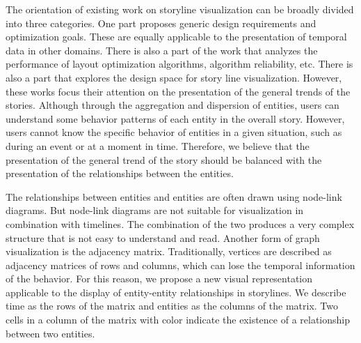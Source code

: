 The orientation of existing work on storyline visualization can be broadly divided into three categories. One part proposes generic design requirements and optimization goals. These are equally applicable to the presentation of temporal data in other domains. There is also a part of the work that analyzes the performance of layout optimization algorithms, algorithm reliability, etc. There is also a part that explores the design space for story line visualization. However, these works focus their attention on the presentation of the general trends of the stories. Although through the aggregation and dispersion of entities, users can understand some behavior patterns of each entity in the overall story. However, users cannot know the specific behavior of entities in a given situation, such as during an event or at a moment in time. Therefore, we believe that the presentation of the general trend of the story should be balanced with the presentation of the relationships between the entities.

The relationships between entities and entities are often drawn using node-link diagrams. But node-link diagrams are not suitable for visualization in combination with timelines. The combination of the two produces a very complex structure that is not easy to understand and read. Another form of graph visualization is the adjacency matrix. Traditionally, vertices are described as adjacency matrices of rows and columns, which can lose the temporal information of the behavior. For this reason, we propose a new visual representation applicable to the display of entity-entity relationships in storylines. We describe time as the rows of the matrix and entities as the columns of the matrix. Two cells in a column of the matrix with color indicate the existence of a relationship between two entities.

